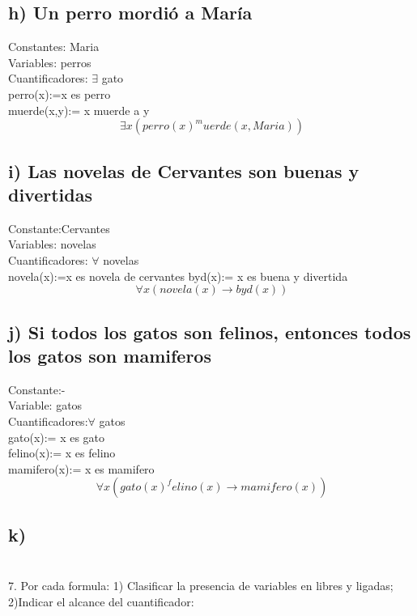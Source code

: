 \documentclass[11pt,letterpaper]{article}
\begin{document}
\subsection*{h) Un perro mordió a María}
Constantes: Maria\\
Variables: perros\\
Cuantificadores: $\exists$ gato \\
perro(x):=x es perro\\
muerde(x,y):= x muerde a y\\
$$\exists x (perro(x)^muerde(x,Maria))$$

\subsection*{i) Las novelas de Cervantes son buenas y divertidas}
Constante:Cervantes \\
Variables: novelas\\
Cuantificadores: $\forall $ novelas\\

novela(x):=x es novela de cervantes
byd(x):= x es buena y divertida
$$\forall x (novela(x) \rightarrow byd(x))$$
\subsection*{j) Si todos los gatos son felinos, entonces todos los gatos son mamiferos}
Constante:- \\
Variable: gatos\\
Cuantificadores:$\forall $ gatos\\

gato(x):= x es gato\\
felino(x):= x es felino\\
mamifero(x):= x es mamifero\\
$$\forall x(gato(x)^felino(x) \rightarrow mamifero(x))$$
\subsection*{k) }


\section{}7. Por cada formula: 1) Clasificar la presencia de variables en libres y ligadas; 2)Indicar el alcance del cuantificador:
\end{document}

